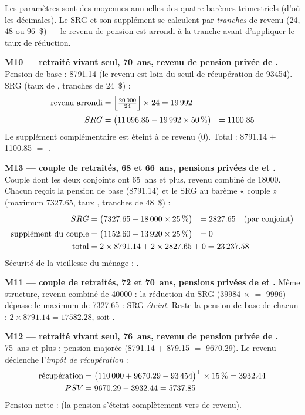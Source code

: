 \pexemples Les paramètres sont des moyennes annuelles des quatre barèmes
trimestriels (d'où les décimales). Le SRG et son supplément se calculent par
\emph{tranches} de revenu (\num{24}, \num{48} ou
\num{96}~\$) — le revenu de pension est arrondi à la tranche
avant d'appliquer le taux de réduction.

\medskip\noindent\textbf{M10 --- retraité vivant seul, 70~ans, revenu de pension privée de .}
Pension de base : \num{8791.14} (le revenu est loin du seuil de
récupération de \num{93454}). SRG (taux de ,
tranches de \num{24}~\$) :
\begin{align*}
\text{revenu arrondi} &= \Bigl\lfloor \tfrac{\num{20000}}{\num{24}} \Bigr\rfloor \times \num{24} = \num{19992} \\
SRG &= \bigl(\num{11096.85} - \num{19992} \times \num{50}\,\%\bigr)^{+} = \num{1100.85}
\end{align*}
Le supplément complémentaire est éteint à ce revenu (\num{0}).
Total : \num{8791.14} $+$ \num{1100.85} $=$ .

\medskip\noindent\textbf{M13 --- couple de retraités, 68 et 66~ans, pensions privées de  et .}
Couple dont les deux conjoints ont 65~ans et plus, revenu combiné de
\num{18000}. Chacun reçoit la pension de base (\num{8791.14}) et le SRG au
barème « couple » (maximum \num{7327.65}, taux ,
tranches de \num{48}~\$) :
\begin{align*}
SRG &= \bigl(\num{7327.65} - \num{18000} \times \num{25}\,\%\bigr)^{+} = \num{2827.65} \quad (\text{par conjoint}) \\
\text{supplément du couple} &= \bigl(\num{1152.60} - \num{13920} \times \num{25}\,\%\bigr)^{+} = \num{0} \\
\text{total} &= 2 \times \num{8791.14} + 2 \times \num{2827.65} + \num{0} = \num{23237.58}
\end{align*}
Sécurité de la vieillesse du ménage : .

\medskip\noindent\textbf{M11 --- couple de retraités, 72 et 70~ans, pensions privées de  et .}
Même structure, revenu combiné de \num{40000} : la réduction du SRG
(\num{39984} $\times$  $=$
\num{9996}) dépasse le maximum de
\num{7327.65} : SRG \emph{éteint}. Reste la pension de base de chacun :
$2 \times \num{8791.14} = \num{17582.28}$, soit .

\medskip\noindent\textbf{M12 --- retraité vivant seul, 76~ans, revenu de pension privée de .}
75~ans et plus : pension majorée (\num{8791.14} $+$ \num{879.15}
$=$ \num{9670.29}). Le revenu déclenche l'\emph{impôt de récupération} :
\begin{align*}
\text{récupération} &= \bigl(\num{110000} + \num{9670.29} - \num{93454}\bigr)^{+} \times \num{15}\,\% = \num{3932.44} \\
PSV &= \num{9670.29} - \num{3932.44} = \num{5737.85}
\end{align*}
Pension nette :  (la pension s'éteint complètement vers
 de revenu).
